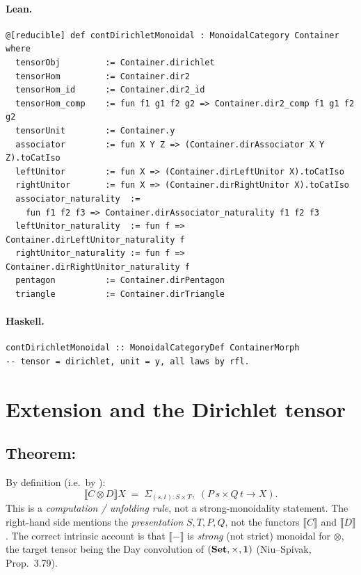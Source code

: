 \documentclass[11pt,a4paper]{article}
\begin{document}
\paragraph{Lean.}
\begin{lstlisting}[style=lean]
@[reducible] def contDirichletMonoidal : MonoidalCategory Container where
  tensorObj         := Container.dirichlet
  tensorHom         := Container.dir2
  tensorHom_id      := Container.dir2_id
  tensorHom_comp    := fun f1 g1 f2 g2 => Container.dir2_comp f1 g1 f2 g2
  tensorUnit        := Container.y
  associator        := fun X Y Z => (Container.dirAssociator X Y Z).toCatIso
  leftUnitor        := fun X => (Container.dirLeftUnitor X).toCatIso
  rightUnitor       := fun X => (Container.dirRightUnitor X).toCatIso
  associator_naturality  :=
    fun f1 f2 f3 => Container.dirAssociator_naturality f1 f2 f3
  leftUnitor_naturality  := fun f => Container.dirLeftUnitor_naturality f
  rightUnitor_naturality := fun f => Container.dirRightUnitor_naturality f
  pentagon          := Container.dirPentagon
  triangle          := Container.dirTriangle
\end{lstlisting}

\paragraph{Haskell.}
\begin{lstlisting}[style=haskell]
contDirichletMonoidal :: MonoidalCategoryDef ContainerMorph
-- tensor = dirichlet, unit = y, all laws by rfl.
\end{lstlisting}


\section{Extension and the Dirichlet tensor}

\subsection{Theorem: }

\begin{thm}
By definition (i.e.\ by ):
\[
  \llbracket C \otimes D \rrbracket X
  \;=\;
  \Sigma_{(s,t) : S \times T},\; (P\,s \times Q\,t \to X).
\]
This is a \emph{computation / unfolding rule}, not a strong-monoidality statement.
The right-hand side mentions the \emph{presentation} $S, T, P, Q$, not the
functors $\llbracket C \rrbracket$ and $\llbracket D \rrbracket$.  The correct
intrinsic account is that $\llbracket{-}\rrbracket$ is \emph{strong} (not
strict) monoidal for $\otimes$, the target tensor being the Day convolution of
$({\bf Set}, \times, \mathbf{1})$ (Niu--Spivak, Prop.~3.79).
\end{thm}
\end{document}
